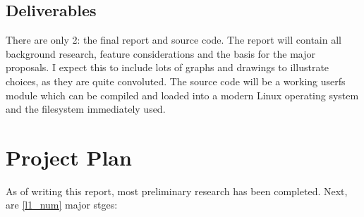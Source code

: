 \subsection{Deliverables}

    There are only 2: the final report and source code. The report will contain
    all background research, feature considerations and the basis for the major
    proposals. I expect this to include lots of graphs and drawings to
    illustrate choices, as they are quite convoluted. The source code will be a
    working userfs module which can be compiled and loaded into a modern Linux
    operating system and the filesystem immediately used.

%
%
\section{Project Plan}

    As of writing this report, most preliminary research has been completed.
    Next, are \ref{l1_num} major stges:


